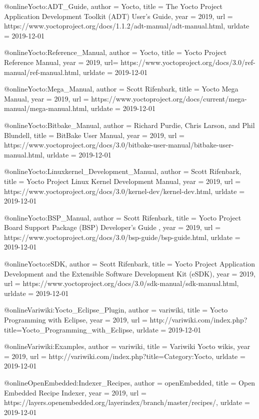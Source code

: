 @online{Yocto:ADT_Guide,
author = {Yocto},
title = {The Yocto Project Application Development Toolkit (ADT) User's Guide},
year = 2019,
url = {https://www.yoctoproject.org/docs/1.1.2/adt-manual/adt-manual.html},
urldate = {2019-12-01}
}


@online{Yocto:Reference_Manual,
author = {Yocto},
title = {Yocto Project Reference Manual},
year = 2019,
url= {https://www.yoctoproject.org/docs/3.0/ref-manual/ref-manual.html},
urldate = {2019-12-01}
}


@online{Yocto:Mega_Manual,
author = {Scott Rifenbark},
title = {Yocto Mega Manual},
year = 2019,
url = {https://www.yoctoproject.org/docs/current/mega-manual/mega-manual.html},
urldate = {2019-12-01}
}


@online{Yocto:Bitbake_Manual,
author = {Richard Purdie, Chris Larson, and Phil Blundell},
title = {BitBake User Manual},
year = 2019,
url = {https://www.yoctoproject.org/docs/3.0/bitbake-user-manual/bitbake-user-manual.html},
urldate = {2019-12-01}
}

@online{Yocto:Linuxkernel_Development_Manual,
author = {Scott Rifenbark},
title = {Yocto Project Linux Kernel Development Manual},
year = 2019,
url = {https://www.yoctoproject.org/docs/3.0/kernel-dev/kernel-dev.html},
urldate = {2019-12-01}
}


@online{Yocto:BSP_Manual,
author = {Scott Rifenbark},
title = {Yocto Project Board Support Package (BSP) Developer's Guide },
year = 2019,
url = {https://www.yoctoproject.org/docs/3.0/bsp-guide/bsp-guide.html},
urldate = {2019-12-01}
}


@online{Yocto:eSDK,
author = {Scott Rifenbark},
title = {Yocto Project Application Development and the Extensible Software Development Kit (eSDK)},
year = 2019,
url = {https://www.yoctoproject.org/docs/3.0/sdk-manual/sdk-manual.html},
urldate = {2019-12-01}
}




@online{Variwiki:Yocto_Eclipse_Plugin,
author = {variwiki},
title = {Yocto Programming with Eclipse},
year = 2019,
url = {http://variwiki.com/index.php?title=Yocto_Programming_with_Eclipse},
urldate = {2019-12-01}
}


@online{Variwiki:Examples,
author = {variwiki},
title = {Variwiki Yocto wikis},
year = 2019,
url = {http://variwiki.com/index.php?title=Category:Yocto},
urldate = {2019-12-01}
}


@online{OpenEmbedded:Indexer_Recipes,
author = {openEmbedded},
title = {Open Embedded Recipe Indexer},
year = 2019,
url = {https://layers.openembedded.org/layerindex/branch/master/recipes/},
urldate = {2019-12-01}
}


